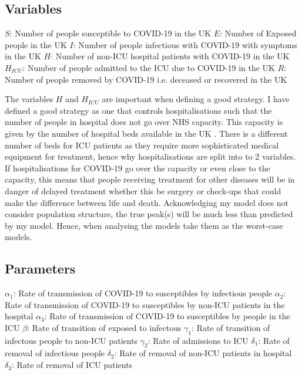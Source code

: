 \documentclass[11pt]{article}
\begin{document}
\subsection{Variables}
$S$: Number of people susceptible to COVID-19 in the UK
 \newline  $E$: Number of Exposed people in the UK
 \newline  $I$: Number of people infectious with COVID-19 with symptoms in the UK
 \newline  $H$: Number of non-ICU hospital patients with COVID-19 in the UK
 \newline  $H_{ICU}$: Number of people admitted to the ICU due to COVID-19 in the UK
 \newline  $R$: Number of people removed by COVID-19 i.e. deceased or recovered in the UK\par
The variables $H$ and $H_{ICU}$ are important when defining a good strategy. I have defined a good strategy as one that controls hospitalisations such that the number of people in hospital does not go over NHS capacity. This capacity is given by the number of hospital beds available in the UK \citep{HBEDS}. There is a different number of beds for ICU patients as they require more sophisticated medical equipment for treatment, hence why hospitalisations are split into to 2 variables. If hospitalisations for COVID-19 go over the capacity or even close to the capacity, this means that people receiving treatment for other diseases will be in danger of delayed treatment whether this be surgery or check-ups that could make the difference between life and death. Acknowledging my model does not consider population structure, the true peak(s) will be much less than predicted by my model. Hence, when analysing the models take them as the worst-case models.
\subsection{Parameters}
$ \alpha_1$: Rate of transmission of COVID-19 to susceptibles by infectious people
\newline $ \alpha_2$: Rate of transmission of COVID-19 to susceptibles by non-ICU patients in the hospital
\newline$ \alpha_3$: Rate of transmission of COVID-19 to susceptibles by people in the ICU
\newline$ \beta$: Rate of transition of exposed to infectous
\newline $ \gamma_1 $: Rate of transition of infectous people to non-ICU patients
\newline $ \gamma_2 $:  Rate of admissions to ICU
\newline $ \delta_1$: Rate of removal of infectious people
\newline $ \delta_2$: Rate of removal of non-ICU patients in hospital
\newline $ \delta_3$: Rate of removal of ICU patients  \par
\end{document}
